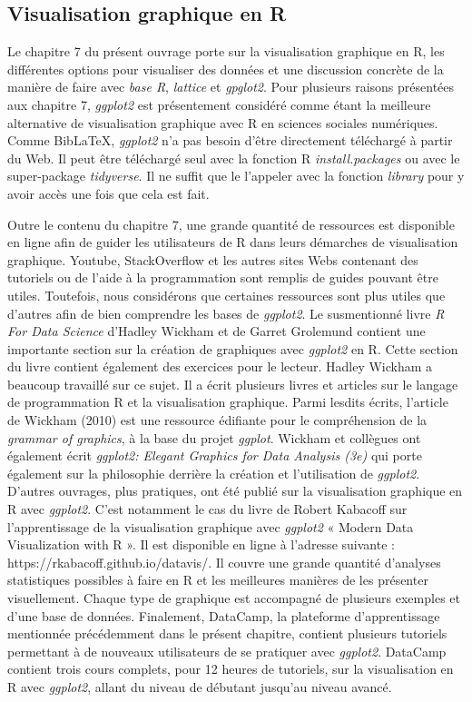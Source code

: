 \documentclass[
  letterpaper,
]{scrbook}
\begin{document}
\hypertarget{visualisation-graphique-en-r}{%
\subsection{Visualisation graphique en
R}\label{visualisation-graphique-en-r}}

Le chapitre 7 du présent ouvrage porte sur la visualisation graphique en
R, les différentes options pour visualiser des données et une discussion
concrète de la manière de faire avec \emph{base R}, \emph{lattice} et
\emph{gpglot2}. Pour plusieurs raisons présentées aux chapitre 7,
\emph{ggplot2} est présentement considéré comme étant la meilleure
alternative de visualisation graphique avec R en sciences sociales
numériques. Comme BibLaTeX, \emph{ggplot2} n'a pas besoin d'être
directement téléchargé à partir du Web. Il peut être téléchargé seul
avec la fonction R \emph{install.packages} ou avec le super-package
\emph{tidyverse}. Il ne suffit que le l'appeler avec la fonction
\emph{library} pour y avoir accès une fois que cela est fait.

Outre le contenu du chapitre 7, une grande quantité de ressources est
disponible en ligne afin de guider les utilisateurs de R dans leurs
démarches de visualisation graphique. Youtube, StackOverflow et les
autres sites Webs contenant des tutoriels ou de l'aide à la
programmation sont remplis de guides pouvant être utiles. Toutefois,
nous considérons que certaines ressources sont plus utiles que d'autres
afin de bien comprendre les bases de \emph{ggplot2}. Le susmentionné
livre \emph{R For Data Science} d'Hadley Wickham et de Garret Grolemund
contient une importante section sur la création de graphiques avec
\emph{ggplot2} en R. Cette section du livre contient également des
exercices pour le lecteur. Hadley Wickham a beaucoup travaillé sur ce
sujet. Il a écrit plusieurs livres et articles sur le langage de
programmation R et la visualisation graphique. Parmi lesdits écrits,
l'article de Wickham (2010) est une ressource édifiante pour le
compréhension de la \emph{grammar of graphics}, à la base du projet
\emph{ggplot}. Wickham et collègues ont également écrit \emph{ggplot2:
Elegant Graphics for Data Analysis (3e)} qui porte également sur la
philosophie derrière la création et l'utilisation de \emph{ggplot2}.
D'autres ouvrages, plus pratiques, ont été publié sur la visualisation
graphique en R avec \emph{ggplot2}. C'est notamment le cas du livre de
Robert Kabacoff sur l'apprentissage de la visualisation graphique avec
\emph{ggplot2} « Modern Data Visualization with R ». Il est disponible
en ligne à l'adresse suivante : https://rkabacoff.github.io/datavis/. Il
couvre une grande quantité d'analyses statistiques possibles à faire en
R et les meilleures manières de les présenter visuellement. Chaque type
de graphique est accompagné de plusieurs exemples et d'une base de
données. Finalement, DataCamp, la plateforme d'apprentissage mentionnée
précédemment dans le présent chapitre, contient plusieurs tutoriels
permettant à de nouveaux utilisateurs de se pratiquer avec
\emph{ggplot2}. DataCamp contient trois cours complets, pour 12 heures
de tutoriels, sur la visualisation en R avec \emph{ggplot2}, allant du
niveau de débutant jusqu'au niveau avancé.
\end{document}
